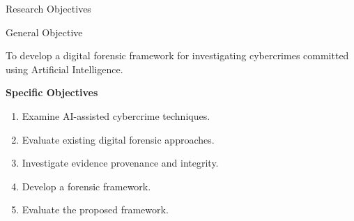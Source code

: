 \documentclass[aspectratio=169,11pt]{beamer}
\begin{document}
	\begin{frame}{Research Objectives}
		
		\begin{block}{General Objective}
			
			To develop a digital forensic framework for investigating
			cybercrimes committed using Artificial Intelligence.
			
		\end{block}
		
		\vspace{0.3cm}
		
		\textbf{Specific Objectives}
		
		\begin{enumerate}
			
			\item Examine AI-assisted cybercrime techniques.
			
			\item Evaluate existing digital forensic approaches.
			
			\item Investigate evidence provenance and integrity.
			
			\item Develop a forensic framework.
			
			\item Evaluate the proposed framework.
			
		\end{enumerate}
		
	\end{frame}
	
	
\end{document}
